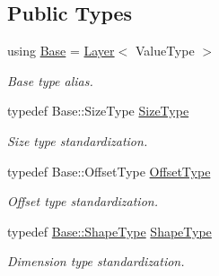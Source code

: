 \subsection*{Public Types}
\begin{DoxyCompactItemize}
\item 
using \hyperlink{classffnn_1_1layer_1_1_output_a76c3074490fd13bd2cdd86f53322da45}{Base} = \hyperlink{classffnn_1_1layer_1_1_layer}{Layer}$<$ Value\-Type $>$
\begin{DoxyCompactList}\small\item\em Base type alias. \end{DoxyCompactList}\item 
typedef Base\-::\-Size\-Type \hyperlink{classffnn_1_1layer_1_1_output_a5e41de6c9249494dd9c6a819d7a30e20}{Size\-Type}
\begin{DoxyCompactList}\small\item\em Size type standardization. \end{DoxyCompactList}\item 
typedef Base\-::\-Offset\-Type \hyperlink{classffnn_1_1layer_1_1_output_a6780ece144b80cb2be355dd65096e9db}{Offset\-Type}
\begin{DoxyCompactList}\small\item\em Offset type standardization. \end{DoxyCompactList}\item 
typedef \hyperlink{classffnn_1_1layer_1_1_layer_ae2f2d0063ab4b2c2a3a6ebf81f4ec32f}{Base\-::\-Shape\-Type} \hyperlink{classffnn_1_1layer_1_1_output_ab3b7fdade20b477ce77b2fab91117a7f}{Shape\-Type}
\begin{DoxyCompactList}\small\item\em Dimension type standardization. \end{DoxyCompactList}\end{DoxyCompactItemize}
